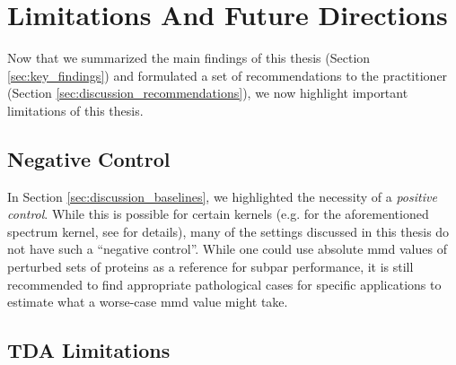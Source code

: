 \section{Limitations And Future Directions}\label{sec:discussion_limitations}

Now that we summarized the main findings of this thesis (Section
\ref{sec:key_findings}) and formulated a set of recommendations to the
practitioner (Section \ref{sec:discussion_recommendations}), we now highlight
important limitations of this thesis.


\subsection{Negative Control}

In Section \ref{sec:discussion_baselines}, we highlighted the necessity of a
\emph{positive control}. While this is possible for certain kernels (e.g. for
the aforementioned spectrum kernel, see \cite{kucera2021conditional} for
details), many of the settings discussed in this thesis do not have such a
``negative control''. While one could use absolute \acrshort{mmd} values of perturbed sets
of proteins as a reference for subpar performance, it is still recommended to find
appropriate pathological cases for specific applications to estimate what a worse-case
\acrshort{mmd} value might take.



\subsection{TDA Limitations}\label{sec:tda_limitations}

